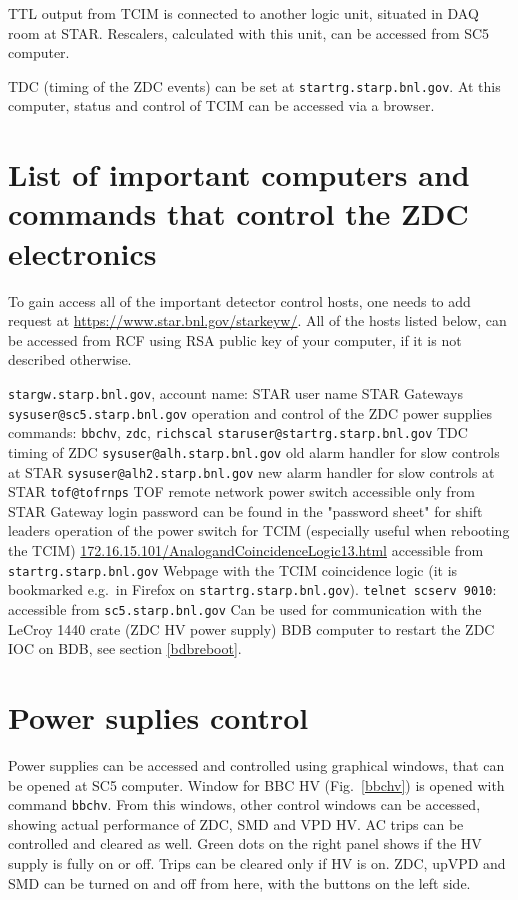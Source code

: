 TTL output from TCIM is connected to another logic unit, situated in DAQ room at STAR. Rescalers, calculated with this unit, can be accessed from SC5 computer.

TDC (timing of the ZDC events) can be set at \texttt{startrg.starp.bnl.gov}. At this computer, status and control of TCIM can be accessed via a browser.

\section{List of important computers and commands that control the ZDC electronics}

To gain access all of the important detector control hosts, one needs to add request at \url{https://www.star.bnl.gov/starkeyw/}. All of the hosts listed below, can be accessed from RCF using RSA public key of your computer, if it is not described otherwise.
\begin{outline}
 \1 \texttt{stargw.starp.bnl.gov}, account name: STAR user name
   \2 STAR Gateways
 \1 \texttt{sysuser@sc5.starp.bnl.gov} 
   \2 operation and control of the ZDC power supplies
   \2 commands: \texttt{bbchv}, \texttt{zdc}, \texttt{richscal}
 \1 \texttt{staruser@startrg.starp.bnl.gov}
   \2 TDC timing of ZDC
 \1 \texttt{sysuser@alh.starp.bnl.gov} 
   \2 old alarm handler for slow controls at STAR
 \1 \texttt{sysuser@alh2.starp.bnl.gov}
   \2 new alarm handler for slow controls at STAR
 \1 \texttt{tof@tofrnps}
   \2 TOF remote network power switch
   \2 accessible only from STAR Gateway
   \2 login password can be found in the "password sheet" for shift leaders
   \2 operation of the power switch for TCIM (especially useful when rebooting the TCIM)
 \1 \url{172.16.15.101/AnalogandCoincidenceLogic13.html}
   \2 accessible from \texttt{startrg.starp.bnl.gov}
   \2 Webpage with the TCIM coincidence logic (it is bookmarked e.g.\ in Firefox on \texttt{startrg.starp.bnl.gov}).
 \1 \texttt{telnet scserv 9010}: 
   \2 accessible  from \texttt{sc5.starp.bnl.gov}
   \2 Can be used for communication with the LeCroy 1440 crate (ZDC HV power supply)
   \2 BDB computer
   \2 to restart the ZDC IOC on BDB, see section \ref{bdbreboot}.
\end{outline}


\section{Power suplies control}
Power supplies can be accessed and controlled using graphical windows, that can be opened at SC5 computer. 
Window for BBC HV (Fig.~\ref{bbchv}) is opened with command \texttt{bbchv}. From this windows, other control windows can be accessed, showing actual performance of ZDC, SMD and VPD HV. AC trips can be controlled and cleared as well. Green dots on the right panel shows if the HV supply is fully on or off. Trips can be cleared only if HV is on. ZDC, upVPD and SMD can be turned on and off from here, with the buttons on the left side.

